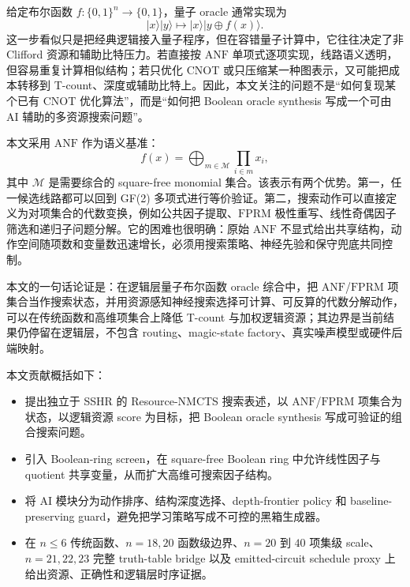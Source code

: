 \documentclass[UTF8,fontset=macnew,11pt]{ctexart}
\newcommand{\method}{Resource-NMCTS}
\newcommand{\screen}{Boolean-ring screen}
\newcommand{\anf}{\ensuremath{\mathrm{ANF}}}
\newcommand{\fprm}{\ensuremath{\mathrm{FPRM}}}
\newcommand{\xor}{\ensuremath{\oplus}}
\newcommand{\ttable}{truth-table}
\begin{document}
给定布尔函数 $f:\{0,1\}^n\rightarrow\{0,1\}$，量子 oracle 通常实现为
\begin{equation}
  |x\rangle |y\rangle \mapsto |x\rangle |y\xor f(x)\rangle .
  \label{eq:oracle}
\end{equation}
这一步看似只是把经典逻辑接入量子程序，但在容错量子计算中，它往往决定了非 Clifford 资源和辅助比特压力。若直接按 \anf{} 单项式逐项实现，线路语义透明，但容易重复计算相似结构；若只优化 CNOT 或只压缩某一种图表示，又可能把成本转移到 T-count、深度或辅助比特上。因此，本文关注的问题不是“如何复现某个已有 CNOT 优化算法”，而是“如何把 Boolean oracle synthesis 写成一个可由 AI 辅助的多资源搜索问题”。

本文采用 \anf{} 作为语义基准：
\begin{equation}
  f(x)=\bigoplus_{m\in\mathcal{M}}\prod_{i\in m}x_i ,
  \label{eq:anf}
\end{equation}
其中 $\mathcal{M}$ 是需要综合的 square-free monomial 集合。该表示有两个优势。第一，任一候选线路都可以回到 GF(2) 多项式进行等价验证。第二，搜索动作可以直接定义为对项集合的代数变换，例如公共因子提取、\fprm{} 极性重写、线性奇偶因子筛选和递归子问题分解。它的困难也很明确：原始 \anf{} 不显式给出共享结构，动作空间随项数和变量数迅速增长，必须用搜索策略、神经先验和保守兜底共同控制。

本文的一句话论证是：在逻辑层量子布尔函数 oracle 综合中，把 \anf{}/\fprm{} 项集合当作搜索状态，并用资源感知神经搜索选择可计算、可反算的代数分解动作，可以在传统函数和高维项集合上降低 T-count 与加权逻辑资源；其边界是当前结果仍停留在逻辑层，不包含 routing、magic-state factory、真实噪声模型或硬件后端映射。

本文贡献概括如下：
\begin{itemize}
  \item 提出独立于 SSHR 的 \method{} 搜索表述，以 \anf{}/\fprm{} 项集合为状态，以逻辑资源 score 为目标，把 Boolean oracle synthesis 写成可验证的组合搜索问题。
  \item 引入 \screen{}，在 square-free Boolean ring 中允许线性因子与 quotient 共享变量，从而扩大高维可搜索因子结构。
  \item 将 AI 模块分为动作排序、结构深度选择、depth-frontier policy 和 baseline-preserving guard，避免把学习策略写成不可控的黑箱生成器。
  \item 在 $n\leq6$ 传统函数、$n=18,20$ 函数级边界、$n=20$ 到 $40$ 项集级 scale、$n=21,22,23$ 完整 \ttable{} bridge 以及 emitted-circuit schedule proxy 上给出资源、正确性和逻辑层时序证据。
\end{itemize}
\end{document}
